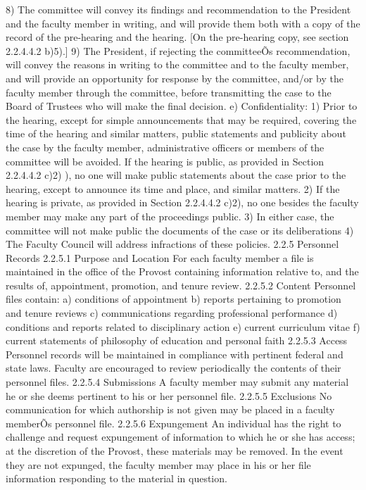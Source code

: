 \documentclass[letterpaper, 11pt]{article}
\begin{document}
8) The committee will convey its findings and recommendation to the President and the faculty member in writing, and will provide them both with a copy of the record of the pre-hearing and the hearing.  [On the pre-hearing copy, see section 2.2.4.4.2 b)5).]
9) The President, if rejecting the committeeÕs recommendation, will convey the reasons in writing to the committee and to the faculty member, and will provide an opportunity for response by the committee, and/or by the faculty member through the committee, before transmitting the case to the Board of Trustees who will make the final decision.
e) Confidentiality:
1) Prior to the hearing, except for simple announcements that may be required, covering the time of the hearing and similar matters, public statements and publicity about the case by the faculty member, administrative officers or members of the committee will be avoided.  If the hearing is public, as provided in Section 2.2.4.4.2 c)2) ), no one will make public statements about the case prior to the hearing, except to announce its time and place, and similar matters.
2) If the hearing is private, as provided in Section 2.2.4.4.2 c)2), no one besides the faculty member may make any part of the proceedings public.
3) In either case, the committee will not make public the documents of the case or its deliberations
4) The Faculty Council will address infractions of these policies.
2.2.5 Personnel Records
2.2.5.1 Purpose and Location
   For each faculty member a file is maintained in the office of the Provost containing information relative to, and the results of, appointment, promotion, and tenure review.
2.2.5.2 Content
   Personnel files contain:
a) conditions of appointment
b) reports pertaining to promotion and tenure reviews
c) communications regarding professional performance
d) conditions and reports related to disciplinary action
e) current curriculum vitae
f) current statements of philosophy of education and personal faith
2.2.5.3 Access
   Personnel records will be maintained in compliance with pertinent federal and state laws.  Faculty are encouraged to review periodically the contents of their personnel files.
2.2.5.4 Submissions
   A faculty member may submit any material he or she deems pertinent to his or her personnel file.
2.2.5.5 Exclusions
   No communication for which authorship is not given may be placed in a faculty memberÕs personnel file.
2.2.5.6 Expungement
   An individual has the right to challenge and request expungement of information to which he or she has access; at the discretion of the Provost, these materials may be removed.  In the event they are not expunged, the faculty member may place in his or her file information responding to the material in question.
\end{document}
